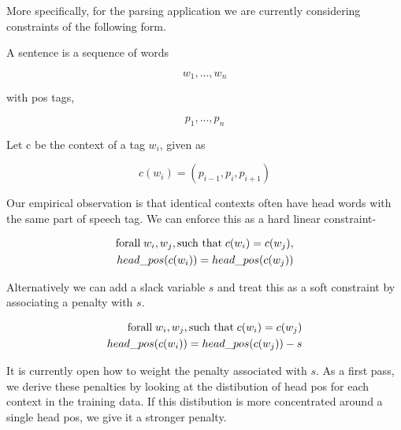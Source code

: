 \documentclass{article}
\begin{document}
More specifically, for the parsing application we are currently considering constraints
of the following form. 

A sentence is a sequence of words

$$w_1, ..., w_n$$

with pos tags, 

$$p_1, ... , p_n$$

Let c be the context of a tag $w_{i}$, given as 

$$c(w_i) = (p_{i-1}, p_{i}, p_{i+1}) $$

Our empirical observation is that identical contexts often have head
words with the same part of speech tag. We can enforce this as a hard
linear constraint-

\begin{eqnarray*}
\hbox{forall}\; w_i, w_j, \hbox{such that}\; c(w_i) = c(w_j), \\
head\_pos(c(w_i)) = head\_pos(c(w_j)) 
\end{eqnarray*}

Alternatively we can add a slack variable $s$ and treat this as a soft constraint by associating a penalty with $s$.

\begin{eqnarray*}
\hbox{forall}\;  w_i, w_j, \hbox{such that}\; c(w_i) = c(w_j) \\
head\_pos(c(w_i)) = head\_pos(c(w_j)) - s
\end{eqnarray*}


It is currently open how to weight the
penalty associated with $s$. As a first pass, we derive these penalties by
looking at the distibution of head pos for each context in the
training data. If this distibution is more concentrated around a single
head pos, we give it a stronger penalty.
\end{document}
